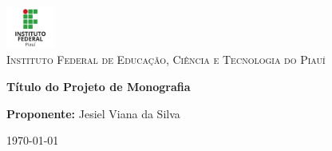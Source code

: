 \begin{titlepage}
\begin{center}

\includegraphics[width=0.12\textwidth]{img/logo_ifpi.png}~\\[1cm]

\textsc{\Large Instituto Federal de Educação, Ciência e Tecnologia do Piauí\\[5cm]}



{\large \bfseries Título do Projeto de Monografia \\[3cm]}


\large\textbf{Proponente:}
Jesiel Viana da Silva\\[3cm]

\vfill

{\large \today}

\end{center}
\end{titlepage}